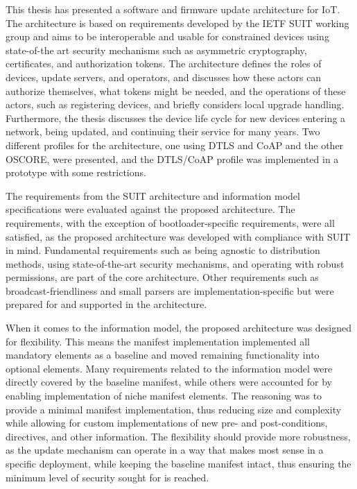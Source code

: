 \documentclass[0-thesis.tex]{subfiles}
\begin{document}
This thesis has presented a software and firmware update architecture for IoT. The
architecture is based on requirements developed by the IETF SUIT working group and aims to
be interoperable and usable for constrained devices using state-of-the art security
mechanisms such as asymmetric cryptography, certificates, and authorization tokens. The
architecture defines the roles of devices, update servers, and operators, and discusses
how these actors can authorize themselves, what tokens might be needed, and the operations
of these actors, such as registering devices, and briefly considers local upgrade handling.
Furthermore, the thesis discusses the device life cycle for new devices entering a network,
being updated, and continuing their service for many years. Two different profiles for the
architecture, one using DTLS and CoAP and the other OSCORE, were presented, and the
DTLS/CoAP profile was implemented in a prototype with some restrictions.

The requirements from the SUIT architecture and information model specifications were
evaluated against the proposed architecture. The requirements, with the exception of
bootloader-specific requirements, were all satisfied, as the proposed architecture was
developed with compliance with SUIT in mind. Fundamental requirements such as being
agnostic to distribution methods, using state-of-the-art security mechanisms, and
operating with robust permissions, are part of the core architecture. Other requirements
such as broadcast-friendliness and small parsers are implementation-specific but were
prepared for and supported in the architecture.

When it comes to the information model, the proposed architecture was designed for
flexibility. This means the manifest implementation implemented all mandatory elements as
a baseline and moved remaining functionality into optional elements. Many requirements
related to the information model were directly covered by the baseline manifest, while
others were accounted for by enabling implementation of niche manifest elements. The
reasoning was to provide a minimal manifest implementation, thus reducing size and
complexity while allowing for custom implementations of new pre- and post-conditions,
directives, and other information. The flexibility should provide more robustness, as the
update mechanism can operate in a way that makes most sense in a specific deployment,
while keeping the baseline manifest intact, thus ensuring the minimum level of security
sought for is reached. 
\end{document}
